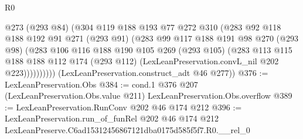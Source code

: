 \begin{lexlean}{R0}
\begin{coremodule}
              @273
              (@293 @84)
              (@304
                @119
                @188
                @193
                @77
                @272
                @310
                (@283
                  @92
                  @118
                  @188
                  @192
                  @91
                  @271
                  (@293 @91)
                  (@283
                    @99
                    @117
                    @188
                    @191
                    @98
                    @270
                    (@293 @98)
                    (@283
                      @106
                      @116
                      @188
                      @190
                      @105
                      @269
                      (@293 @105)
                      (@283
                        @113
                        @115
                        @188
                        @188
                        @112
                        @174
                        (@293 @112)
                        (LexLeanPreservation.convL_nil @202 @223))))))))))
      (LexLeanPreservation.construct_adt @46 @277))
@376 := LexLeanPreservation.Obs
@384 := cond.{1} @376 @207 (LexLeanPreservation.Obs.value @211) LexLeanPreservation.Obs.overflow
@389 := LexLeanPreservation.RunConv @202 @46 @174 @212
@396 := LexLeanPreservation.run_of_funRel
    @202
    @46
    @174
    @212
    LexLeanPreserve.C6ad15312456867121dba0175d585f5f7.R0.__rel_0
\end{coremodule}
\end{lexlean}
